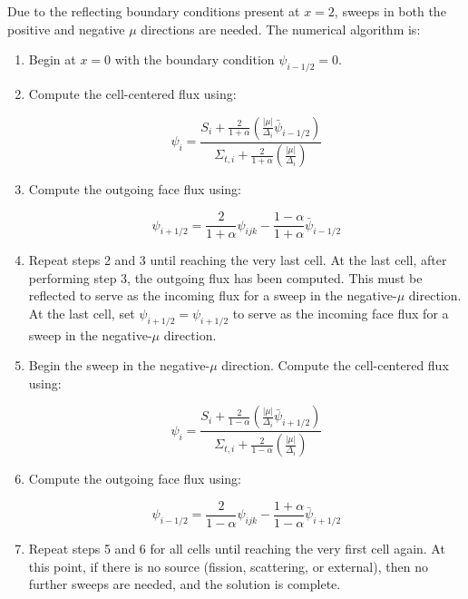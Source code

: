 \documentclass[10pt]{article}
\begin{document}
Due to the reflecting boundary conditions present at \(x=2\), sweeps in both the positive and negative \(\mu\) directions are needed. The numerical algorithm is:

\begin{enumerate}
\item Begin at \(x=0\) with the boundary condition \(\psi_{i-1/2}=0\). 
\item Compute the cell-centered flux using:

\begin{equation}
\psi_{i}=\frac{S_{i}+\frac{2}{1+\alpha}\left(\frac{|\mu|}{\Delta_i}\bar{\psi}_{i-1/2}\right)}{\Sigma_{t,i}+\frac{2}{1+\alpha}\left(\frac{|\mu|}{\Delta_i}\right)}
\end{equation}

\item Compute the outgoing face flux using:

\begin{equation}
\psi_{i+1/2}=\frac{2}{1+\alpha}\psi_{ijk}-\frac{1-\alpha}{1+\alpha}\bar{\psi}_{i-1/2}
\end{equation}

\item Repeat steps 2 and 3 until reaching the very last cell. At the last cell, after performing step 3, the outgoing flux has been computed. This must be reflected to serve as the incoming flux for a sweep in the negative-\(\mu\) direction. At the last cell, set \(\psi_{i+1/2}=\psi_{i+1/2}\) to serve as the incoming face flux for a sweep in the negative-\(\mu\) direction.

\item Begin the sweep in the negative-\(\mu\) direction. Compute the cell-centered flux using:

\begin{equation}
\psi_{i}=\frac{S_{i}+\frac{2}{1-\alpha}\left(\frac{|\mu|}{\Delta_i}\bar{\psi}_{i+1/2}\right)}{\Sigma_{t,i}+\frac{2}{1-\alpha}\left(\frac{|\mu|}{\Delta_i}\right)}
\end{equation}

\item Compute the outgoing face flux using:

\begin{equation}
\psi_{i-1/2}=\frac{2}{1-\alpha}\psi_{ijk}-\frac{1+\alpha}{1-\alpha}\bar{\psi}_{i+1/2}
\end{equation}

\item Repeat steps 5 and 6 for all cells until reaching the very first cell again. At this point, if there is no source (fission, scattering, or external), then no further sweeps are needed, and the solution is complete.
\end{enumerate}
\end{document}
